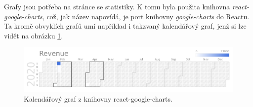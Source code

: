Grafy jsou potřeba na stránce se statistiky. K tomu byla použita knihovna \textit{react-google-charts},
což, jak název napovídá, je port knihovny \textit{google-charts} do Reactu. Ta kromě obvyklích grafů umí
například i takzvaný kalendářový graf, jenž si lze vidět na obrázku \ref{fig:google_charts}.

\begin{figure}[!htb] \centering
  \includegraphics[width=145mm]{../img/google_charts.png}
  \caption{Kalendářový graf z knihovny react-google-charts.}
  \label{fig:google_charts}
\end{figure}

